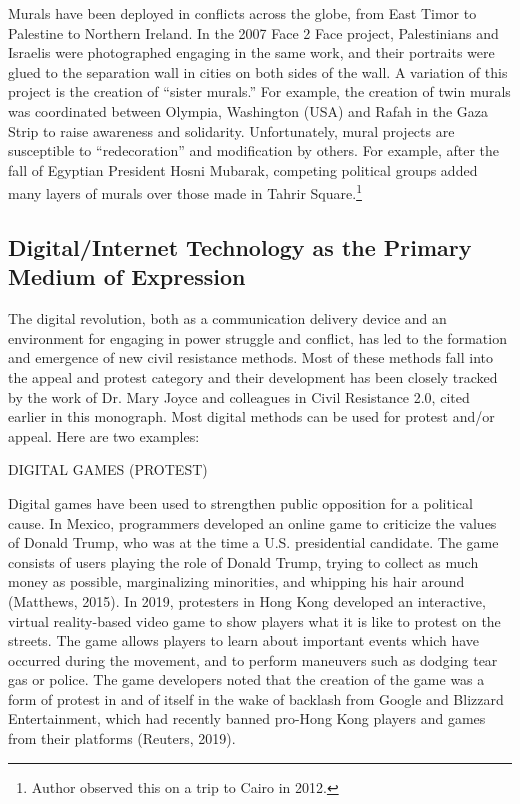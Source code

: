 \documentclass[twoside,a4paper,12pt,fleqn,openany]{extbook}
\begin{document}
Murals have been deployed in conflicts across the globe, from East Timor to Palestine to Northern Ireland. In the 2007 Face 2 Face project, Palestinians and Israelis were photographed engaging in the same work, and their portraits were glued to the separation wall in cities on both sides of the wall. A variation of this project is the creation of “sister murals.” For example, the creation of twin murals was coordinated between Olympia, Washington (USA) and Rafah in the Gaza Strip to raise awareness and solidarity. Unfortunately, mural projects are susceptible to “redecoration” and modification by others. For example, after the fall of Egyptian President Hosni Mubarak, competing political groups added many layers of murals over those made in Tahrir Square.\footnote{Author observed this on a trip to Cairo in 2012.}

\subsection*{Digital/Internet Technology as the Primary Medium of Expression}

The digital revolution, both as a communication delivery device and an environment for engaging in power struggle and conflict, has led to the formation and emergence of new civil resistance methods. Most of these methods fall into the appeal and protest category and their development has been closely tracked by the work of Dr. Mary Joyce and colleagues in Civil Resistance 2.0, cited earlier in this monograph. Most digital methods can be used for protest and/or appeal. Here are two examples:

DIGITAL GAMES (PROTEST)

Digital games have been used to strengthen public opposition for a political cause. In Mexico, programmers developed an online game to criticize the values of Donald Trump, who was at the time a U.S. presidential candidate. The game consists of users playing the role of Donald Trump, trying to collect as much money as possible, marginalizing minorities, and whipping his hair around (Matthews, 2015). In 2019, protesters in Hong Kong developed an interactive, virtual reality-based video game to show players what it is like to protest on the streets. The game allows players to learn about important events which have occurred during the movement, and to perform maneuvers such as dodging tear gas or police. The game developers noted that the creation of the game was a form of protest in and of itself in the wake of backlash from Google and Blizzard Entertainment, which had recently banned pro-Hong Kong players and games from their platforms (Reuters, 2019).
\end{document}
